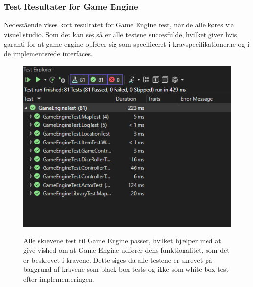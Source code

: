 \newpage 

\subsubsection{Test Resultater for Game Engine}
Nedestående vises kort resultatet for Game Engine test, når de alle køres via visuel studio. Som det kan ses så er alle testene succesfulde, hvilket giver hvis garanti for at
game engine opfører sig som specificeret i kravspecifikationerne og i de implementerede interfaces.

\begin{figure}[h]
  \centering
  \caption{Alle skrevene test til Game Engine passer, hvilket hjælper med at give vished
          om at Game Engine udfører dens funktionalitet, som det er beskrevet i kravene.
          Dette siges da alle testene er skrevet på baggrund af kravene som black-box tests
          og ikke som white-box test efter implementeringen.}
  \includegraphics[scale=0.4]{02-body/Images/Test Results.png}
  \label{fig:TestResultsGameEngine}
\end{figure}




